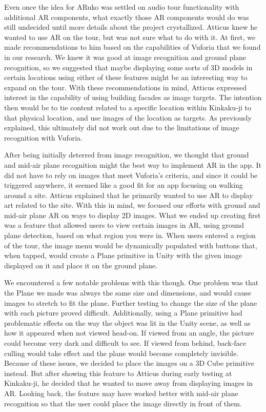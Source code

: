 \documentclass[a4paper, 10pt, american, titlepage]{article}
\begin{document}
Even once the idea for ARuko was settled on audio tour functionality with 
additional AR components, what exactly those AR components would do was still
undecided until more details about the project crystallized. Atticus knew he 
wanted to use AR on the tour, but was not sure what to do with it. At first, we
made recommendations to him based on the capabilities of Vuforia that we found 
in our research. We knew it was good at image recognition and ground plane 
recognition, so we suggested that maybe displaying some sorts of 3D models in 
certain locations using either of these features might be an interesting way to
expand on the tour. With these recommendations in mind, Atticus expressed 
interest in the capability of using building facades as image targets. The 
intention then would be to tie content related to a specific location within 
Kinkaku-ji to that physical location, and use images of the location as 
targets. As previously explained, this ultimately did not work out due to the 
limitations of image recognition with Vuforia. 

After being initially deterred from image recognition, we thought that ground
and mid-air plane recognition might the best way to implement AR in the app. 
It did not have to rely on images that meet Vuforia's criteria, and since it 
could be triggered anywhere, it seemed like a good fit for an app focusing on
walking around a site. Atticus explained that he primarily wanted to use AR to
display art related to the site. With this in mind, we focused our efforts with
ground and mid-air plane AR on ways to display 2D images. What we ended up 
creating first was a feature that allowed users to view certain images in AR, 
using ground plane detection, based on what region you were in. When users 
entered a region of the tour, the image menu would be dynamically populated 
with buttons that, when tapped, would create a Plane primitive in Unity with 
the given image displayed on it and place it on the ground plane. 

We encountered a few notable problems with this though. One problem was that 
the Plane we made was always the same size and dimensions, and would cause 
images to stretch to fit the plane. Further testing to change the size of the
plane with each picture proved difficult. Additionally, using a Plane primitive
had problematic effects on the way the object was lit in the Unity scene, as 
well as how it appeared when not viewed head-on. If viewed from an angle, the 
picture could become very dark and difficult to see. If viewed from behind,
back-face culling would take effect and the plane would become completely 
invisible. Because of these issues, we decided to place the images on a 3D Cube
primitive instead. But after showing this feature to Atticus during early 
testing at Kinkaku-ji, he decided that he wanted to move away from displaying 
images in AR. Looking back, the feature may have worked better with mid-air 
plane recognition so that the user could place the image directly in front of 
them. 
\end{document}
